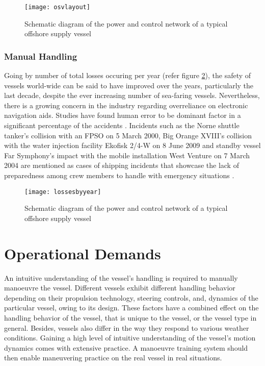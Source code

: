 
\begin{figure}
	\centering
	\texttt{[image: osvlayout]}
	\caption{Schematic diagram of the power and control network of a typical offshore supply vessel}
	\label{fig:osvlayout}
\end{figure}

\subsubsection{Manual Handling}
Going by number of total losses occuring per year (refer figure \ref{fig:lossesbyyear}), the safety of vessels world-wide can be said to have improved over the years, particularly the last decade, despite the ever increasing number of sea-faring vessels. Nevertheless, there is a growing concern in the industry regarding overreliance on electronic navigation aids. Studies have found human error to be dominant factor in a significant percentage of the accidents \cite{baker2005accident, hauff2014analysis}. Incidents such as the Norne shuttle tanker's collision with an FPSO on 5 March 2000, Big Orange XVIII's collision with the water injection facility Ekofisk 2/4-W on 8 June 2009 and standby vessel Far Symphony's impact with the mobile installation West Venture on 7 March 2004 are mentioned as cases of shipping incidents that showcase the lack of preparedness among crew members to handle with emergency situations \cite{vinnem2013offshore}.

\begin{figure}
	\centering
	\texttt{[image: lossesbyyear]}
	\caption{Schematic diagram of the power and control network of a typical offshore supply vessel}
	\label{fig:lossesbyyear}
\end{figure}

\section{Operational Demands}

An intuitive understanding of the vessel’s handling is required to manually manoeuvre the vessel. Different vessels exhibit different handling behavior depending on their propulsion technology, steering controls, and, dynamics of the particular vessel, owing to its design. These factors have a combined effect on the handling behavior of the vessel, that is unique to the vessel, or the vessel type in general. Besides, vessels also differ in the way they respond to various weather conditions. 
Gaining a high level of intuitive understanding of the vessel’s motion dynamics comes with extensive practice. A manoeuvre training system should then enable maneuvering practice on the real vessel in real situations.

